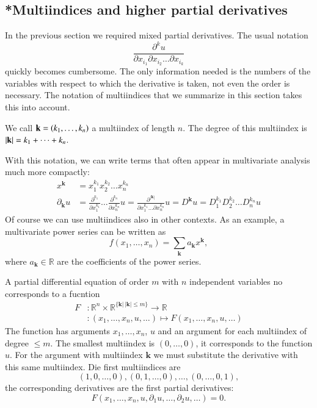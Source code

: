 \subsection{*Multiindices and higher partial derivatives
\label{klassifikation:multiindizes}}
In the previous section we required mixed partial derivatives.
The usual notation
\[
\frac{\partial^k u}{\partial x_{i_1}\partial x_{i_2}\dots\partial x_{i_k}}
\]
quickly becomes cumbersome.
The only information needed is the numbers of the variables with respect
to which the derivative is taken, not even the order is necessary.
The notation of multiindices that we summarize in this section takes
this into account.
\begin{definition}
We call
${\bf k}=(k_1,\dots,k_n)$ a multiindex of length $n$.
The degree of this multiindex is $|{\bf k}|=k_1+\dots+k_n$.
\end{definition}
With this notation, we can write terms that often appear in multivariate
analysis much more compactly:
\begin{align*}
x^{\mathbf k}&=x_1^{k_1}x_2^{k_2}\dots x_n^{k_n}\\
\partial_{\mathbf k}u
&=\frac{\partial^{k_1}}{\partial x_1^{k_1}}\dots
\frac{\partial^{k_n}}{\partial x_n^{k_n}}u
=\frac{\partial^{|{\mathbf k}|}}{\partial x_1^{k_1}\dots\partial x_n^{k_n}}u
=D^{\mathbf k}u=D_1^{k_1}D_2^{k_2}\dots D_n^{k_n}u
\end{align*}
Of course we can use multiindices also in other contexts.
As an example, a multivariate power series can be written as
\[
f(x_1,\dots,x_n)=\sum_{\mathbf k}a_{\mathbf k}x^{\mathbf k},
\]
where $a_{\mathbf k}\in\mathbb R$ are the coefficients of the power series.

A partial differential equation of order $m$ with $n$ independent variables
no corresponds to a fucntion
\begin{align*}
F&\colon \mathbb R^n\times \mathbb R^{\{{\mathbf k}|\,|{\mathbf k}|\le m\}} \to \mathbb R
\\
&\colon(x_1,\dots,x_n,u, \dots)\mapsto F(x_1,\dots,x_n,u,\dots)
\end{align*}
The function has arguments $x_1,\dots,x_n$, $u$ and an argument for
each multiindex of degree $\le m$.
The smallest multiindex is
$(0,\dots,0)$, it corresponds to the function $u$.
For the argument with
multiindex ${\mathbf k}$ we must substitute the derivative with
this same multiindex.
Die first multiindices are
\[
(1,0,\dots,0), (0,1,\dots,0),\dots, (0,\dots, 0,1),
\]
the corresponding derivatives are the first partial derivatives:
\[
F(x_1,\dots,x_n,u,\partial_1 u,\dots,\partial_2 u,\dots)=0.
\]

